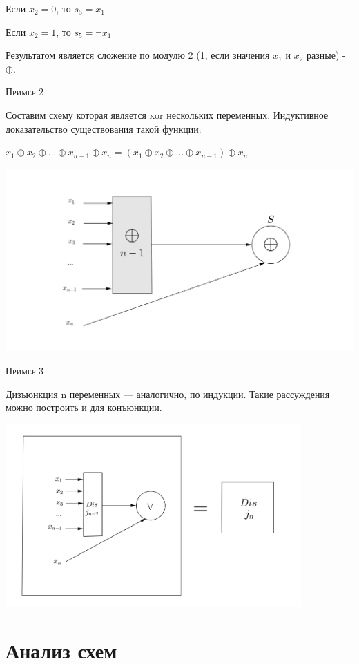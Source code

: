 \documentclass[a4paper, 12pt]{article}
\begin{document}
 Если $x_2 = 0$, то $s_5 = x_1$
  
 Если $x_2 = 1$, то $s_5 = \lnot x_1$
 
 Результатом является сложение по модулю 2 (1, если значения $x_1$ и $x_2$ разные) - $\oplus$.
 
 \textsc{Пример 2}
 
 Составим схему которая является xor нескольких переменных. Индуктивное доказательство существования такой функции:
  
$ x_1 \oplus x_2 \oplus \ldots \oplus x_{n-1} \oplus x_n = (x_1 \oplus x_2 \oplus \ldots \oplus x_{n-1}) \oplus x_n$
 
\includegraphics[height=7cm]{Images/2.png}
 
 \textsc{Пример 3}
 
 Дизъюнкция n переменных --- аналогично, по индукции. Такие рассуждения можно построить и для конъюнкции.
 
 \includegraphics[height=7cm]{Images/3.png}
 
 \section*{Анализ схем}
 
\end{document}
